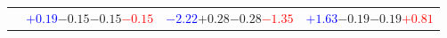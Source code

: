 \documentclass[compress]{beamer}
\begin{document}
\begin{frame}
\begin{tabular}{r | c | c | c}
          & \textcolor{blue}{$+0.19$}\hspace{0.1 cm}$-0.15$\hspace{0.1 cm}$-0.15$\hspace{0.1 cm}\textcolor{red}{$-0.15$} & \textcolor{blue}{$-2.22$}\hspace{0.1 cm}$+0.28$\hspace{0.1 cm}$-0.28$\hspace{0.1 cm}\textcolor{red}{$-1.35$} & \textcolor{blue}{$+1.63$}\hspace{0.1 cm}$-0.19$\hspace{0.1 cm}$-0.19$\hspace{0.1 cm}\textcolor{red}{$+0.81$} \\
\end{tabular}
\end{frame}
\end{document}
